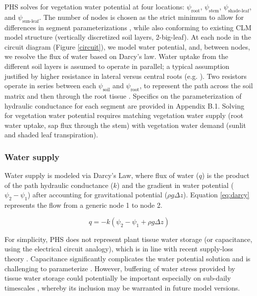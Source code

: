 \documentclass[draft,linenumbers]{agujournal}
\begin{document}
  PHS solves for vegetation water potential at four locations: $\psi_{\text{root}}$, $\psi_{\text{stem}}$, $\psi_{\text{shade-leaf}}$, and $\psi_{\text{sun-leaf}}$.
  The number of nodes is chosen as the strict minimum to allow for differences in segment parameterizations \citep{simonin2015, sperry2015}, while also conforming to existing CLM model structure (vertically discretized soil layers, 2-big-leaf).
  At each node in the circuit diagram (Figure \ref{circuit}), we model water potential, and, between nodes, we resolve the flux of water based on Darcy's law. 
  Water uptake from the different soil layers is assumed to operate in parallel; a typical assumption justified by higher resistance in lateral versus central roots (e.g. \cite{williams2001}). 
  Two resistors operate in series between each $\psi_{\text{soil}}$ and $\psi_{\text{root}}$, to represent the path across the soil matrix and then through the root tissue \citep{williams1996}. 
  Specifics on the parameterization of hydraulic conductance for each segment are provided in Appendix B.1.
  Solving for vegetation water potential requires matching vegetation water supply (root water uptake, sap flux through the stem) with vegetation water demand (sunlit and shaded leaf transpiration).

   
    \subsubsection{Water supply}
    \label{sect:supply}
    Water supply is modeled via Darcy's Law, where flux of water ($q$) is the product of the path hydraulic conductance ($k$) and the gradient in water potential ($\psi_2-\psi_1$) after accounting for gravitational potential ($\rho g \Delta z$).  
    Equation \ref{eq:darcy} represents the flow from a generic node 1 to node 2. 
    
     \begin{linenomath*}
     \begin{equation}
     \label{eq:darcy}
     q = -k\left(\psi_2 - \psi_1 + \rho g \Delta z\right)
     \end{equation}
     \end{linenomath*}
    
    For simplicity, PHS does not represent plant tissue water storage (or capacitance, using the electrical circuit analogy), which is in line with recent supply-loss theory \citep{sperry2015}.  
    Capacitance significantly complicates the water potential solution \citep{celia1990} and is challenging to parameterize \citep{bartlett2016}. 
    However, buffering of water stress provided by tissue water storage could potentially be important especially on sub-daily timescales \citep{meinzer2009,epila2017}, 
    whereby its inclusion may be warranted in future model versions.
\end{document}
